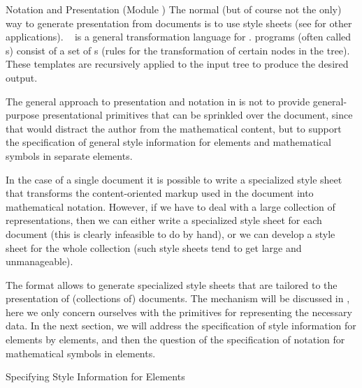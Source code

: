 \begin{tchapter}[id=pres,short=Notation and Presentation]{Notation and Presentation (Module {})}
The normal (but of course not the only) way to generate presentation from {\xml} documents
is to use {\xslt} style sheets (see {} for other applications).
{\xslt}~\cite{Clark:xslt99} is a general transformation language for {\xml}.  {\xslt}
programs (often called {s}) consist of a set of {s}
(rules for the transformation of certain nodes in the {\xml} tree). These templates are
recursively applied to the input tree to produce the desired output.

The general approach to presentation and notation in {\omdoc} is not to provide
general-purpose presentational primitives that can be sprinkled over the document, since
that would distract the author from the mathematical content, but to support the
specification of general style information for {\omdoc} elements and mathematical symbols
in separate elements.

In the case of a single {\omdoc} document it is possible to write a specialized
style sheet that transforms the content-oriented markup used in the document into
mathematical notation. However, if we have to deal with a large collection of
{\omdoc} representations, then we can either write a specialized style sheet for
each document (this is clearly infeasible to do by hand), or we can develop a
style sheet for the whole collection (such style sheets tend to get large and
unmanageable).

The {\omdoc} format allows to generate specialized style sheets that are tailored to the
presentation of (collections of) {\omdoc} documents. The mechanism will be discussed in
{}, here we only concern ourselves with the {\omdoc} primitives
for representing the necessary data. In the next section, we will address the
specification of style information for {\omdoc} elements by {} elements,
and then the question of the specification of notation for mathematical symbols in
{} elements.

\begin{tsection}[id=omstyle,short=Styling OMDoc Elements]{Specifying Style Information for {\omdoc} Elements}
  

\end{tsection}
\end{tchapter}
